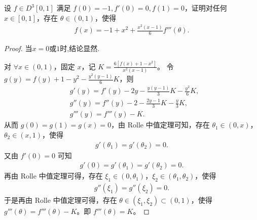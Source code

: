 \documentclass[../../main.tex]{subfiles}%
\begin{document}
\begin{example}
设 $f \in D^3[0,1]$ 满足 $f(0) = -1, f'(0) = 0, f(1) = 0$，证明对任何 $x \in [0,1]$，存在 $\theta \in (0,1)$，使得
\begin{align*}
f(x) = -1 + x^2 + \frac{x^2 (x - 1)}{6} f'''(\theta).
\end{align*}
\end{example}
\begin{proof}

当$x=0$或$1$时,结论显然.

对 $\forall x\in (0,1)$，固定 $x$，记 $K=\frac{6[f(x) +1-x^2]}{x^2(x-1)}$。
令 $g(y) =f(y) +1-y^2-\frac{y^2(y-1)}{6}K$，则
\begin{align*}
&g'(y) =f'(y) -2y-\frac{y(y-1)}{3}K-\frac{y^2}{6}K, \\
&g''(y) =f''(y) -2-\frac{2y-1}{3}K-\frac{y}{3}K, \\
&g'''(y) =f'''(y) -K.
\end{align*}
从而 $g(0) =g(1) =g(x) =0$，由 Rolle 中值定理可知，存在 $\theta_1\in (0,x)$，$\theta_2\in (x,1)$，使得
\begin{align*}
g'(\theta_1) =g'(\theta_2) =0.
\end{align*}
又由 $f'(0) =0$ 可知
\begin{align*}
g'(0) =g'(\theta_1) =g'(\theta_2) =0.
\end{align*}
再由 Rolle 中值定理可得，存在 $\xi_1\in (0,\theta_1)$，$\xi_2\in (\theta_1,\theta_2)$，使得
\begin{align*}
g''(\xi_1) =g''(\xi_2) =0.
\end{align*}
于是再由 Rolle 中值定理可得，存在 $\theta \in (\xi_1,\xi_2) \subset (0,1)$，使得 $g'''(\theta) =f'''(\theta) -K$。即 $f'''(\theta) =K$。

\end{proof}
\end{document}
